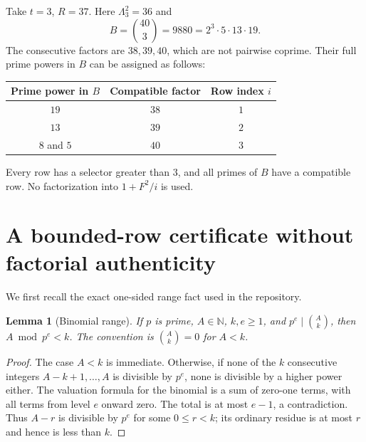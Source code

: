 \documentclass[11pt]{article}
\newtheorem{lemma}[theorem]{Lemma}
\theoremstyle{definition}
\newcommand{\N}{\mathbb N}
\begin{document}
Take $t=3$, $R=37$. Here $\Lambda_3^2=36$ and
\[
 B=\binom{40}{3}=9880=2^3\cdot5\cdot13\cdot19.
\]
The consecutive factors are $38,39,40$, which are not pairwise coprime.
Their full prime powers in $B$ can be assigned as follows:
\begin{center}
\begin{tabular}{ccc}
\toprule
Prime power in $B$ & Compatible factor & Row index $i$\\
\midrule
$19$ & $38$ & $1$\\
$13$ & $39$ & $2$\\
$8$ and $5$ & $40$ & $3$\\
\bottomrule
\end{tabular}
\end{center}
Every row has a selector greater than $3$, and all primes of $B$ have
a compatible row. No factorization into $1+F^2/i$ is used.

\section{A bounded-row certificate without factorial authenticity}

We first recall the exact one-sided range fact used in the repository.
\begin{lemma}[Binomial range]\label{lem:range}
If $p$ is prime, $A\in\N$, $k,e\ge1$, and $p^e\mid\binom{A}{k}$, then
$A\bmod p^e<k$. The convention is $\binom{A}{k}=0$ for $A<k$.
\end{lemma}
\begin{proof}
The case $A<k$ is immediate. Otherwise, if none of the $k$ consecutive
integers $A-k+1,\ldots,A$ is divisible by $p^e$, none is divisible by
a higher power either. The valuation formula for the binomial is a sum
of zero-one terms, with all terms from level $e$ onward zero. The total
is at most $e-1$, a contradiction. Thus $A-r$ is divisible by $p^e$
for some $0\le r<k$; its ordinary residue is at most $r$ and hence
is less than $k$.
\end{proof}
\end{document}
